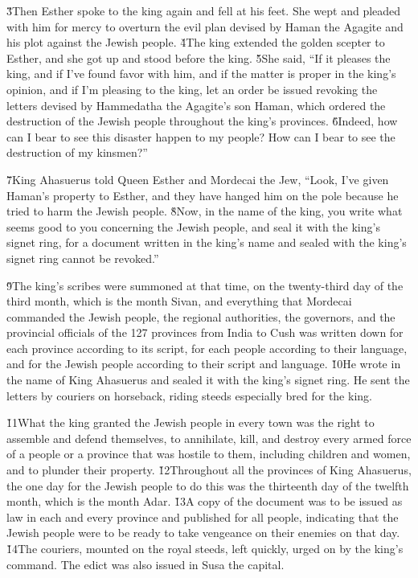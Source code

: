 \v{3}Then Esther spoke to the king again and fell at his feet. She wept and pleaded with him for mercy to overturn the evil plan devised by Haman the Agagite and his plot against the Jewish people. \v{4}The king extended the golden scepter to Esther, and she got up and stood before the king. \v{5}She said, ``If it pleases the king, and if I've found favor with him, and if the matter is proper in the king's opinion, and if I'm pleasing to the king, let an order be issued revoking the letters devised by Hammedatha the Agagite's son Haman, which ordered the destruction of the Jewish people throughout the king's provinces. \v{6}Indeed, how can I bear to see this disaster happen to my people? How can I bear to see the destruction of my kinsmen?''

\v{7}King Ahasuerus told Queen Esther and Mordecai the Jew, ``Look, I've given Haman's property to Esther, and they have hanged him on the pole because he tried to harm the Jewish people. \v{8}Now, in the name of the king, you write what seems good to you concerning the Jewish people, and seal it with the king's signet ring, for a document written in the king's name and sealed with the king's signet ring cannot be revoked.''

\v{9}The king's scribes were summoned at that time, on the twenty-third day of the third month, which is the month Sivan, and everything that Mordecai commanded the Jewish people, the regional authorities, the governors, and the provincial officials of the 127 provinces from India to Cush was written down for each province according to its script, for each people according to their language, and for the Jewish people according to their script and language. \v{10}He wrote in the name of King Ahasuerus and sealed it with the king's signet ring. He sent the letters by couriers on horseback, riding steeds especially bred for the king.

\v{11}What the king granted the Jewish people in every town was the right to assemble and defend themselves, to annihilate, kill, and destroy every armed force of a people or a province that was hostile to them, including children and women, and to plunder their property. \v{12}Throughout all the provinces of King Ahasuerus, the one day for the Jewish people to do this was the thirteenth day of the twelfth month, which is the month Adar. \v{13}A copy of the document was to be issued as law in each and every province and published for all people, indicating that the Jewish people were to be ready to take vengeance on their enemies on that day. \v{14}The couriers, mounted on the royal steeds, left quickly, urged on by the king's command. The edict was also issued in Susa the capital.


